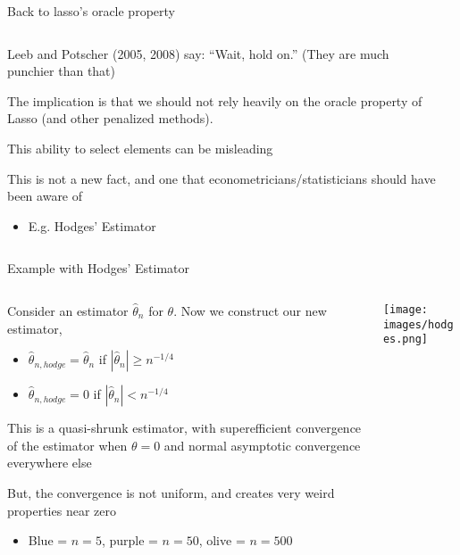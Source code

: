 \documentclass[notes,11pt, aspectratio=169]{beamer}
\newenvironment{wideitemize}{\itemize\addtolength{\itemsep}{10pt}}{\enditemize}
\begin{document}
\begin{frame}{Back to lasso's  oracle property}
  \begin{columns}[T] %
    \begin{column}{.8\textwidth}
      \begin{wideitemize}
      \item Leeb and Potscher (2005, 2008) say:  ``Wait, hold on.'' (They are much punchier than that)
      \item The implication is that we should not rely heavily on the
        oracle property of Lasso (and other penalized methods).
      \item This ability to select elements can be misleading
      \item This is not a new fact, and one that econometricians/statisticians should have been aware of
        \begin{itemize}
        \item E.g. Hodges' Estimator
        \end{itemize}
      \end{wideitemize}
    \end{column}%
  \hfill%
  \begin{column}{.5\textwidth}
  \end{column}
\end{columns}
\end{frame}


\begin{frame}{Example with Hodges' Estimator}
  \begin{columns}[T] %
    \begin{column}{.6\textwidth}
      \begin{wideitemize}
      \item Consider an estimator $\hat{\theta}_{n}$ for $\theta$. Now we construct our new estimator,
        \begin{itemize}
        \item $\hat{\theta}_{n,hodge} = \hat{\theta}_{n}$ if $|\hat{\theta}_{n}|  \geq n^{-1/4}$
        \item $\hat{\theta}_{n,hodge} = 0$ if $|\hat{\theta}_{n}|  < n^{-1/4}$          
        \end{itemize}
      \item This is a quasi-shrunk estimator, with superefficient
        convergence of the estimator when $\theta = 0$ and normal
        asymptotic convergence everywhere else
      \item But, the convergence is not uniform, and creates very weird properties near zero
        \begin{itemize}
        \item Blue = $n=5$, purple = $n=50$, olive = $n=500$
        \end{itemize}
      \end{wideitemize}
    \end{column}%
  \hfill%
  \begin{column}{.4\textwidth}
    \texttt{[image: images/hodges.png]}
  \end{column}
\end{columns}
\end{frame}
\end{document}
